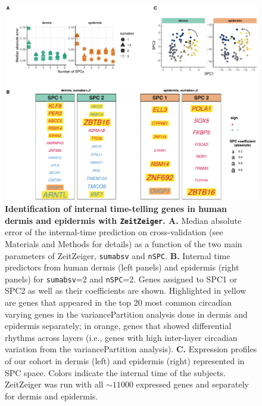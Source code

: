 \begin{figure}[t!]
	\begin{center}
		\includegraphics[scale=0.55]{./Figures/fig3.pdf}
		\caption{\textbf{Identification of internal time-telling genes in human dermis and epidermis with \texttt{ZeitZeiger}. A. }Median absolute error of the internal-time prediction on cross-validation (see Materials and Methods for details) as a function of the two main parameters of ZeitZeiger, \texttt{sumabsv} and \texttt{nSPC}. \textbf{B. }Internal time predictors from human dermis (left panels) and epidermis (right panels) for \texttt{sumabsv}=2 and \texttt{nSPC}=2. Genes assigned to SPC1 or SPC2 as well as their coefficients are shown. Highlighted in yellow are genes that appeared in the top 20 most common circadian varying genes in the variancePartition analysis done in dermis and epidermis separately; in orange, genes that showed differential rhythms across layers (i.e., genes with high inter-layer circadian variation from the variancePartition analysis). \textbf{C. }Expression profiles of our cohort in dermis (left) and epidermis (right) represented in SPC space. Colors indicate the internal time of the subjects. ZeitZeiger was run with all $\sim11000$ expressed genes and separately for dermis and epidermis.}
		\label{fig:fig3}
	\end{center}
\end{figure}

